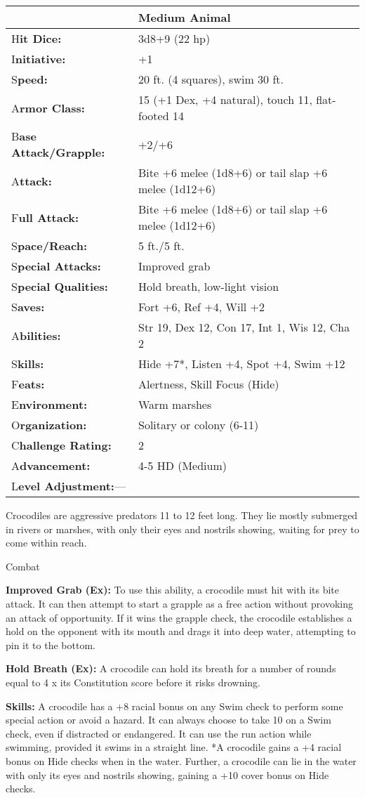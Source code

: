 \documentclass{article}
\begin{document}
\begin{tabular}{|>{\raggedright}p{91pt}|>{\raggedright}p{213pt}|}
\hline
  & Medium Animal\tabularnewline
\hline
H\textbf{it Dice:} & 3d8+9 (22 hp)\tabularnewline
\hline
I\textbf{nitiative:} & +1\tabularnewline
\hline
S\textbf{peed:} & 20 ft. (4 squares), swim 30 ft.\tabularnewline
\hline
A\textbf{rmor Class:} & 15 (+1 Dex, +4 natural), touch 11, flat-footed 14\tabularnewline
\hline
B\textbf{ase Attack/Grapple:} & +2/+6\tabularnewline
\hline
A\textbf{ttack:} & Bite +6 melee (1d8+6) or tail slap +6 melee (1d12+6)\tabularnewline
\hline
F\textbf{ull Attack:} & Bite +6 melee (1d8+6) or tail slap +6 melee (1d12+6)\tabularnewline
\hline
S\textbf{pace/Reach:} & 5 ft./5 ft.\tabularnewline
\hline
S\textbf{pecial Attacks:} & Improved grab\tabularnewline
\hline
S\textbf{pecial Qualities:} & Hold breath, low-light vision\tabularnewline
\hline
S\textbf{aves:} & Fort +6, Ref +4, Will +2\tabularnewline
\hline
A\textbf{bilities:} & Str 19, Dex 12, Con 17, Int 1, Wis 12, Cha 2\tabularnewline
\hline
S\textbf{kills:} & Hide +7*, Listen +4, Spot +4, Swim +12\tabularnewline
\hline
F\textbf{eats:} & Alertness, Skill Focus (Hide)\tabularnewline
\hline
E\textbf{nvironment:} & Warm marshes\tabularnewline
\hline
O\textbf{rganization:} & Solitary or colony (6-11)\tabularnewline
\hline
C\textbf{hallenge Rating:} & 2\tabularnewline
\hline
A\textbf{dvancement:} & 4-5 HD (Medium)\tabularnewline
\hline
L\textbf{evel Adjustment:}--- & \tabularnewline
\hline
\end{tabular}

Crocodiles are aggressive predators 11 to 12 feet long. They lie mostly submerged 
in rivers or marshes, with only their eyes and nostrils showing, waiting for prey 
to come within reach.

Combat

\textbf{Improved Grab (Ex):} To use this ability, a crocodile must hit with its 
bite attack. It can then attempt to start a grapple as a free action without provoking 
an attack of opportunity. If it wins the grapple check, the crocodile establishes 
a hold on the opponent with its mouth and drags it into deep water, attempting 
to pin it to the bottom.

\textbf{Hold Breath (Ex):} A crocodile can hold its breath for a number of rounds 
equal to 4 x its Constitution score before it risks drowning.

\textbf{Skills: }A crocodile has a +8 racial bonus on any Swim check to perform 
some special action or avoid a hazard. It can always choose to take 10 on a Swim 
check, even if distracted or endangered. It can use the run action while swimming, 
provided it swims in a straight line. *A crocodile gains a +4 racial bonus on Hide 
checks when in the water. Further, a crocodile can lie in the water with only its 
eyes and nostrils showing, gaining a +10 cover bonus on Hide checks.
\end{document}

